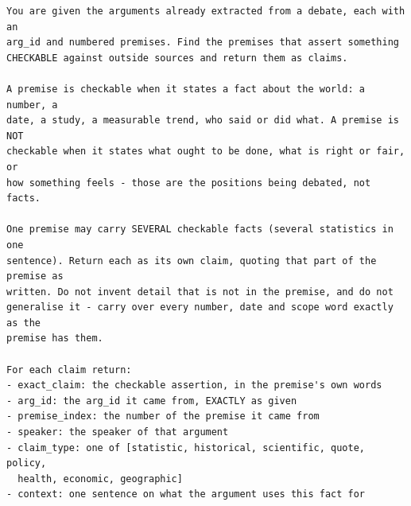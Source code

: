\documentclass[a4paper, 12pt]{book}
\begin{document}
\begin{lstlisting}[basicstyle=\ttfamily\scriptsize,breaklines=true]
You are given the arguments already extracted from a debate, each with an
arg_id and numbered premises. Find the premises that assert something
CHECKABLE against outside sources and return them as claims.

A premise is checkable when it states a fact about the world: a number, a
date, a study, a measurable trend, who said or did what. A premise is NOT
checkable when it states what ought to be done, what is right or fair, or
how something feels - those are the positions being debated, not facts.

One premise may carry SEVERAL checkable facts (several statistics in one
sentence). Return each as its own claim, quoting that part of the premise as
written. Do not invent detail that is not in the premise, and do not
generalise it - carry over every number, date and scope word exactly as the
premise has them.

For each claim return:
- exact_claim: the checkable assertion, in the premise's own words
- arg_id: the arg_id it came from, EXACTLY as given
- premise_index: the number of the premise it came from
- speaker: the speaker of that argument
- claim_type: one of [statistic, historical, scientific, quote, policy,
  health, economic, geographic]
- context: one sentence on what the argument uses this fact for
\end{lstlisting}
\end{document}
